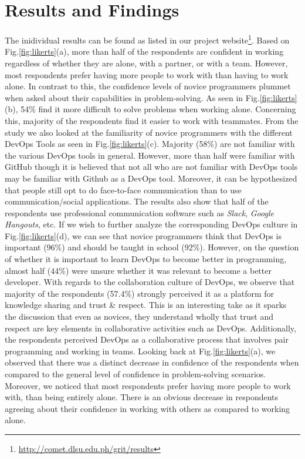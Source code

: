 \documentclass{sigchi}
\begin{document}
\section{Results and Findings}
The inidividual results can be found as listed in our project website\footnote{\url{http://comet.dlsu.edu.ph/grit/results}}.  Based on Fig.\ref{fig:likerts}(a), more than half of the respondents are confident in working regardless of whether they are alone, with a partner, or with a team. However, most respondents prefer having more people to work with than having to work alone.  In contrast to this, the confidence levels of novice programmers plummet when asked about their capabilities in problem-solving. As seen in Fig.\ref{fig:likerts}(b), 54\% find it more difficult to solve problems when working alone. Concerning this, majority of the respondents find it easier to work with teammates. From the study we also looked at the familiarity of novice programmers with the different DevOps Tools as seen in Fig.\ref{fig:likerts}(c). Majority (58\%) are not familiar with the various DevOps tools in general. However, more than half were familiar with GitHub though it is believed that not all who are not familiar with DevOps tools may be familiar with Github as a DevOps tool. Moreover, it can be hypothesized that people still opt to do face-to-face communication than to use communication/social applications. The results also show that half of the respondents use professional communication software such as \textit{Slack}, \textit{Google Hangouts}, etc. If we wish to further analyze the corresponding DevOps culture in Fig.\ref{fig:likerts}(d), we can see that novice programmers think that DevOps is important (96\%) and should be taught in school (92\%). However, on the question of whether it is important to learn DevOps to become better in programming, almost half (44\%) were unsure whether it was relevant to become a better developer. With regards to the collaboration culture of DevOps, we observe that majority of the respondents (57.4\%) strongly perceived it as a platform for knowledge sharing and trust \& respect. This is an interesting take as it sparks the discussion that even as novices, they understand wholly that trust and respect are key elements in collaborative activities such as DevOps. Additionally, the respondents perceived DevOps as a collaborative process that involves pair programming and working in teams. Looking back at Fig.\ref{fig:likerts}(a), we observed that there was a distinct decrease in confidence of the respondents when compared to the general level of confidence in problem-solving scenarios. Moreover, we noticed that most respondents prefer having more people to work with, than being entirely alone. There is an obvious decrease in respondents agreeing about their confidence in working with others as compared to working alone.
\end{document}
